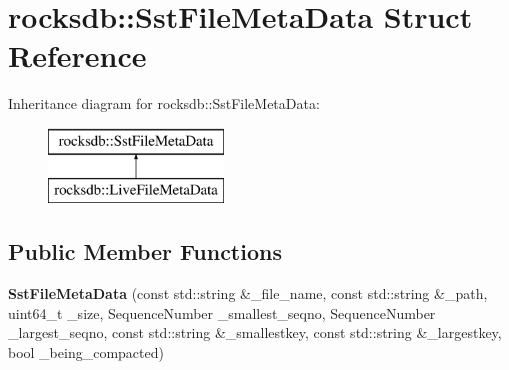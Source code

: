 \hypertarget{structrocksdb_1_1SstFileMetaData}{}\section{rocksdb\+:\+:Sst\+File\+Meta\+Data Struct Reference}
\label{structrocksdb_1_1SstFileMetaData}
Inheritance diagram for rocksdb\+:\+:Sst\+File\+Meta\+Data\+:\begin{figure}[H]
\begin{center}
\leavevmode
\includegraphics[height=2.000000cm]{structrocksdb_1_1SstFileMetaData}
\end{center}
\end{figure}
\subsection*{Public Member Functions}
\begin{DoxyCompactItemize}
\item 
{\bfseries Sst\+File\+Meta\+Data} (const std\+::string \&\+\_\+file\+\_\+name, const std\+::string \&\+\_\+path, uint64\+\_\+t \+\_\+size, Sequence\+Number \+\_\+smallest\+\_\+seqno, Sequence\+Number \+\_\+largest\+\_\+seqno, const std\+::string \&\+\_\+smallestkey, const std\+::string \&\+\_\+largestkey, bool \+\_\+being\+\_\+compacted)\hypertarget{structrocksdb_1_1SstFileMetaData_a10afa59512f9a7165d8b2a7752d4275f}{}\label{structrocksdb_1_1SstFileMetaData_a10afa59512f9a7165d8b2a7752d4275f}

\end{DoxyCompactItemize}
